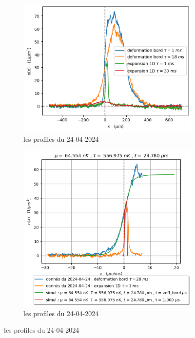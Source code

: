\documentclass[a3, 10pt,twoside]{article}          %
\theoremstyle{plain}
\theoremstyle{definition}
\theoremstyle{remark}
\theoremstyle{definition} %
\begin{document}
	\begin{figure}[ht]
    \centering
    \begin{subfigure}[b]{0.45\textwidth}
        \centering
        \includegraphics[width=\textwidth]{Figures/donnees_24-04-2024}
        \caption{les profiles du 24-04-2024}
        \label{fig:sub1}
    \end{subfigure}
    \hfill
     \begin{subfigure}[b]{0.45\textwidth}
        \centering
        \includegraphics[width=\textwidth]{Figures/simul_deformation_18_24-04-2024}
        \caption{les profiles du 24-04-2024}
        \label{fig:sub1}
    \end{subfigure}
    

\end{figure}
\end{document}
